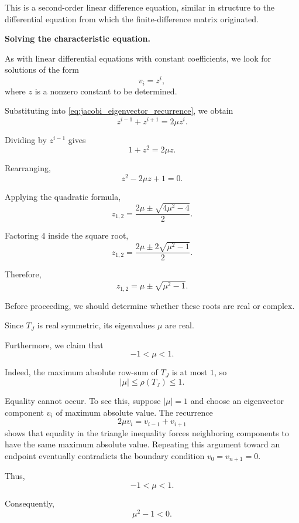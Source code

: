 \documentclass[11pt,a4paper]{article}
\theoremstyle{definition}
\theoremstyle{remark}
\begin{document}
This is a second-order linear difference
equation, similar in structure to the
differential equation from which the
finite-difference matrix originated.

\medskip
\noindent
\textbf{Solving the characteristic equation.}

As with linear differential equations
with constant coefficients, we look for
solutions of the form
\[
    v_i=z^i,
\]
where $z$ is a nonzero constant to be
determined.

Substituting into
\eqref{eq:jacobi_eigenvector_recurrence},
we obtain
\[
    z^{i-1}+z^{i+1}=2\mu z^i.
\]

Dividing by $z^{i-1}$ gives
\[
    1+z^2=2\mu z.
\]

Rearranging,
\begin{equation}
    \boxed{
    z^2-2\mu z+1=0.
    }
    \label{eq:jacobi_characteristic_equation}
\end{equation}

Applying the quadratic formula,
\[
    z_{1,2}
    =
    \frac{
        2\mu\pm\sqrt{4\mu^2-4}
    }{2}.
\]

Factoring $4$ inside the square root,
\[
    z_{1,2}
    =
    \frac{
        2\mu\pm2\sqrt{\mu^2-1}
    }{2}.
\]

Therefore,
\begin{equation}
    \boxed{
    z_{1,2}
    =
    \mu\pm\sqrt{\mu^2-1}.
    }
    \label{eq:jacobi_characteristic_roots}
\end{equation}

Before proceeding, we should determine
whether these roots are real or complex.

Since $T_J$ is real symmetric, its
eigenvalues $\mu$ are real.

Furthermore, we claim that
\[
    -1<\mu<1.
\]

Indeed, the maximum absolute row-sum
of $T_J$ is at most $1$, so
\[
    |\mu|\leq\rho(T_J)\leq1.
\]

Equality cannot occur. To see this,
suppose $|\mu|=1$ and choose an
eigenvector component $v_i$ of maximum
absolute value. The recurrence
\[
    2\mu v_i=v_{i-1}+v_{i+1}
\]
shows that equality in the triangle
inequality forces neighboring
components to have the same maximum
absolute value. Repeating this
argument toward an endpoint eventually
contradicts the boundary condition
$v_0=v_{n+1}=0$.

Thus,
\[
    \boxed{-1<\mu<1.}
\]

Consequently,
\[
    \mu^2-1<0.
\]
\end{document}
